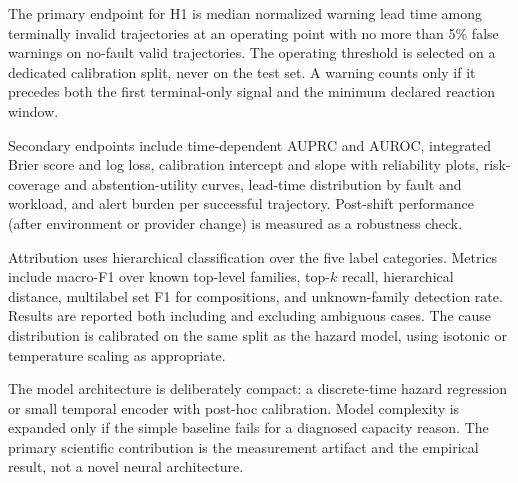 The primary endpoint for H1 is median normalized warning lead time among
terminally invalid trajectories at an operating point with no more than
5\% false warnings on no-fault valid trajectories. The operating threshold
is selected on a dedicated calibration split, never on the test set. A
warning counts only if it precedes both the first terminal-only signal and
the minimum declared reaction window.

Secondary endpoints include time-dependent AUPRC and AUROC, integrated Brier
score and log loss, calibration intercept and slope with reliability plots,
risk-coverage and abstention-utility curves, lead-time distribution by fault
and workload, and alert burden per successful trajectory. Post-shift
performance (after environment or provider change) is measured as a
robustness check.

Attribution uses hierarchical classification over the five label categories.
Metrics include macro-F1 over known top-level families, top-$k$ recall,
hierarchical distance, multilabel set F1 for compositions, and
unknown-family detection rate. Results are reported both including and
excluding ambiguous cases. The cause distribution is calibrated on the same
split as the hazard model, using isotonic or temperature scaling as
appropriate.

The model architecture is deliberately compact: a discrete-time hazard
regression or small temporal encoder with post-hoc calibration. Model
complexity is expanded only if the simple baseline fails for a diagnosed
capacity reason. The primary scientific contribution is the measurement
artifact and the empirical result, not a novel neural architecture.
